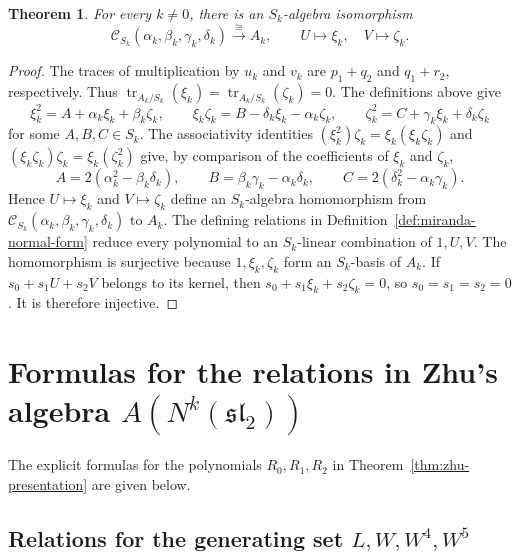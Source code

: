 \documentclass[11 pt]{amsart}
\newtheorem{theorem}{Theorem}
\theoremstyle{definition}
\theoremstyle{plain}
\begin{document}
\begin{theorem}\label{thm:cubic-zhu}
For every $k\neq0$, there is an $S_k$-algebra isomorphism
\[
\mathcal C_{S_k}(\alpha_k,\beta_k,\gamma_k,\delta_k)
\xrightarrow{\ \cong\ }A_k,
\qquad U\longmapsto \xi_k,\quad V\longmapsto \zeta_k.
\]
\end{theorem}

\begin{proof}
The traces of multiplication by $u_k$ and $v_k$ are $p_1+q_2$ and
$q_1+r_2$, respectively. Thus
$\operatorname{tr}_{A_k/S_k}(\xi_k)
=\operatorname{tr}_{A_k/S_k}(\zeta_k)=0$. The definitions above give
\[
\xi_k^2=A+\alpha_k\xi_k+\beta_k\zeta_k,\qquad
\xi_k\zeta_k=B-\delta_k\xi_k-\alpha_k\zeta_k,\qquad
\zeta_k^2=C+\gamma_k\xi_k+\delta_k\zeta_k
\]
for some $A,B,C\in S_k$. The associativity identities
$(\xi_k^2)\zeta_k=\xi_k(\xi_k\zeta_k)$ and
$(\xi_k\zeta_k)\zeta_k=\xi_k(\zeta_k^2)$ give, by comparison of the
coefficients of $\xi_k$ and $\zeta_k$,
\[
A=2(\alpha_k^2-\beta_k\delta_k),\qquad
B=\beta_k\gamma_k-\alpha_k\delta_k,\qquad
C=2(\delta_k^2-\alpha_k\gamma_k).
\]
Hence $U\mapsto \xi_k$ and $V\mapsto \zeta_k$ define an $S_k$-algebra
homomorphism from
$\mathcal C_{S_k}(\alpha_k,\beta_k,\gamma_k,\delta_k)$ to $A_k$.
The defining relations in
Definition~\ref{def:miranda-normal-form} reduce every polynomial to an
$S_k$-linear combination of $1,U,V$. The homomorphism is
surjective because $1,\xi_k,\zeta_k$ form an $S_k$-basis of $A_k$. If
$s_0+s_1U+s_2V$ belongs to its kernel, then
$s_0+s_1\xi_k+s_2\zeta_k=0$, so $s_0=s_1=s_2=0$. It is therefore
injective.
\end{proof}

\appendix
\begingroup\small

\section{Formulas for the relations in Zhu's algebra
$A(N^k(\mathfrak{sl}_2))$}
\label{app-a}

The explicit formulas for the polynomials $R_0,R_1,R_2$ in
Theorem~\ref{thm:zhu-presentation} are given below.

\subsection*{Relations for the generating set $L,W,W^4,W^5$}
\end{document}
